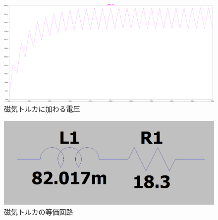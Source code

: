 \begin{figure}[H]
	\centering
		\includegraphics[scale=0.3]{./figure/50current.png}
		\caption{磁気トルカに加わる電圧}
		\label{fig:current50}
\end{figure}

\begin{figure}[H]
	\centering
		\includegraphics[scale=0.3]{./figure/touka.png}
		\caption{磁気トルカの等価回路}
		\label{fig:touka}
\end{figure}